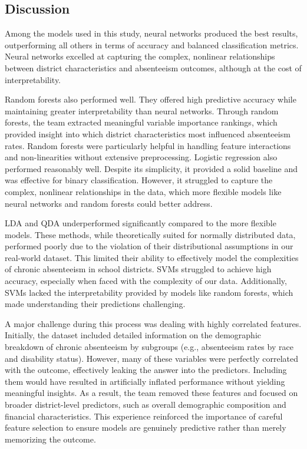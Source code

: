 \documentclass[
  11pt,
]{article}
\begin{document}
\subsection{Discussion}\label{discussion}

Among the models used in this study, neural networks produced the best
results, outperforming all others in terms of accuracy and balanced
classification metrics. Neural networks excelled at capturing the
complex, nonlinear relationships between district characteristics and
absenteeism outcomes, although at the cost of interpretability.

Random forests also performed well. They offered high predictive
accuracy while maintaining greater interpretability than neural
networks. Through random forests, the team extracted meaningful variable
importance rankings, which provided insight into which district
characteristics most influenced absenteeism rates. Random forests were
particularly helpful in handling feature interactions and
non-linearities without extensive preprocessing. Logistic regression
also performed reasonably well. Despite its simplicity, it provided a
solid baseline and was effective for binary classification. However, it
struggled to capture the complex, nonlinear relationships in the data,
which more flexible models like neural networks and random forests could
better address.

LDA and QDA underperformed significantly compared to the more flexible
models. These methods, while theoretically suited for normally
distributed data, performed poorly due to the violation of their
distributional assumptions in our real-world dataset. This limited their
ability to effectively model the complexities of chronic absenteeism in
school districts. SVMs struggled to achieve high accuracy, especially
when faced with the complexity of our data. Additionally, SVMs lacked
the interpretability provided by models like random forests, which made
understanding their predictions challenging.

A major challenge during this process was dealing with highly correlated
features. Initially, the dataset included detailed information on the
demographic breakdown of chronic absenteeism by subgroups (e.g.,
absenteeism rates by race and disability status). However, many of these
variables were perfectly correlated with the outcome, effectively
leaking the answer into the predictors. Including them would have
resulted in artificially inflated performance without yielding
meaningful insights. As a result, the team removed these features and
focused on broader district-level predictors, such as overall
demographic composition and financial characteristics. This experience
reinforced the importance of careful feature selection to ensure models
are genuinely predictive rather than merely memorizing the outcome.
\end{document}
